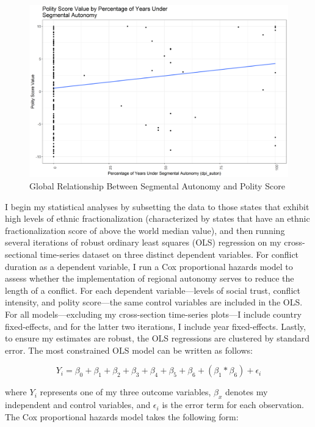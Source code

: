 \documentclass[12pt]{article}
\begin{document}
\begin{figure}[!htbp]
	\begin{center}
		\includegraphics[width = 6in]{csts_polity4_polity_score.png}
	\end{center}
	\caption{Global Relationship Between Segmental Autonomy and Polity Score}
\end{figure}

I begin my statistical analyses by subsetting the data to those states that exhibit high levels of ethnic fractionalization (characterized by states that have an ethnic fractionalization score of above the world median value), and then running several iterations of robust ordinary least squares (OLS) regression on my cross-sectional time-series dataset on three distinct dependent variables. For conflict duration as a dependent variable, I run a Cox proportional hazards model to assess whether the implementation of regional autonomy serves to reduce the length of a conflict. For each dependent variable---levels of social trust, conflict intensity, and polity score---the same control variables are included in the OLS. For all models---excluding my cross-section time-series plots---I include country fixed-effects, and for the latter two iterations, I include year fixed-effects. Lastly, to ensure my estimates are robust, the OLS regressions are clustered by standard error. The most constrained OLS model can be written as follows: 

\begin{equation}
Y_i = \beta_0 + \beta_1 + \beta_2 + \beta_3 + \beta_4 + \beta_5 + \beta_6 + (\beta_1 * \beta_6) + \epsilon_i
\end{equation}

where $Y_i$ represents one of my three outcome variables, $\beta_x$ denotes my independent and control variables, and $\epsilon_i$ is the error term for each observation. The Cox proportional hazards model takes the following form: 
\end{document}
